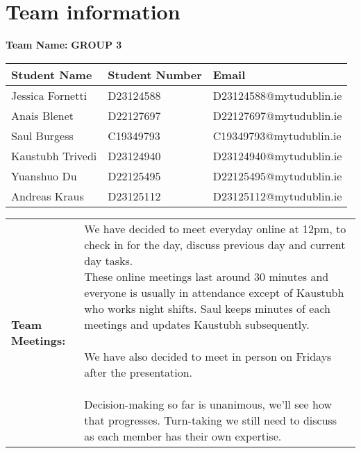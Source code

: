 \documentclass[a4paper,12pt]{article}
\begin{document}
\newpage
\section{Team information}
\textbf{Team Name:} \textbf{GROUP 3}
\vspace{0.2cm}
\begin{table}[h]
    \centering
    \begin{tabularx}{\textwidth}{@{}p{4cm} p{4cm} p{5cm}@{}}
        \toprule Student Name & Student Number & Email \\
        \midrule
            Jessica Fornetti & D23124588 & D23124588@mytudublin.ie \\
            Anais Blenet & D22127697 & D22127697@mytudublin.ie \\
            Saul Burgess & C19349793 & C19349793@mytudublin.ie \\
            Kaustubh Trivedi & D23124940 & D23124940@mytudublin.ie \\
            Yuanshuo Du & D22125495 & D22125495@mytudublin.ie \\
            Andreas Kraus & D23125112 & D23125112@mytudublin.ie \\ 
        \bottomrule 
    \end{tabularx}
\end{table}

\begin{tabular}{|p{}|p{}|}
    \hline
    \textbf{Team Meetings:} & \parbox{0.65\textwidth}
    {\vspace{0.3cm}
    We have decided to meet everyday online at 12pm, to check in for the day, discuss previous day and current day tasks. \\ These online meetings last around 30 minutes and everyone is usually in attendance except of Kaustubh who works night shifts. Saul keeps minutes of each meetings and updates Kaustubh subsequently. \\ \\ We have also decided to meet in person on Fridays after the presentation. \\ \\ Decision-making so far is unanimous, we'll see how that progresses. Turn-taking we still need to discuss as each member has their own expertise. \vspace{0.3cm}} \\
    \hline
\end{tabular}
\end{document}
